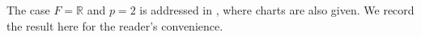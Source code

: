 \documentclass{amsart}
\newtheorem{proposition}[theorem]{Proposition}
\theoremstyle{plain}
\numberwithin{theorem}{section}
\numberwithin{equation}{section}
\numberwithin{figure}{section}
\DeclareMathOperator{\Ext}{Ext}
\newcommand{\mC}{{\mathbb C}}
\newcommand{\mF}{{\mathbb F}}
\newcommand{\mM}{{\mathbb M}}
\newcommand{\mR}{{\mathbb R}}
\newcommand{\cE}{{\mathcal E}}
\newcommand{\0}{\langle 0 \rangle }
\begin{document}

The case $F = \mR$ and $p=2$ is addressed in \cite[Section 6]{LiPetTat25}, where charts are also given. We record the result here for the reader's convenience. 
\end{document}

